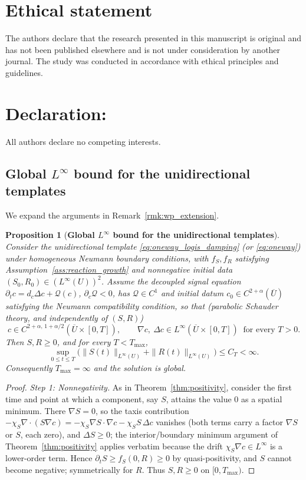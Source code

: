 \documentclass[pdflatex,sn-mathphys-ay]{sn-jnl}
\theoremstyle{thmstyleone}
\newtheorem{proposition}[theorem]{Proposition}
\theoremstyle{definition}
\theoremstyle{remark}
\begin{document}
\section*{Ethical statement}
The authors declare that the research presented in this manuscript is original and has not
been published elsewhere and is not under consideration by another journal. The study was conducted in
accordance with ethical principles and guidelines.

\section*{Declaration:}
All authors declare no competing interests.

\begin{appendices}
\section{Global \texorpdfstring{$L^\infty$}{L-infinity} bound for the unidirectional templates}\label{appsec:global_bound_unidirectional}
We expand the arguments in Remark~\ref{rmk:wp_extension}.

\begin{proposition}[\textbf{Global $L^\infty$ bound for the unidirectional templates}]
\label{prop:global_oneway}
Consider the unidirectional template \eqref{eq:oneway_logis_damping} (or
\eqref{eq:oneway}) under homogeneous Neumann boundary conditions, with $f_S,f_R$
satisfying Assumption~\ref{ass:reaction_growth} and nonnegative initial data
$(S_0,R_0)\in (L^\infty(U))^2$. Assume the decoupled signal equation
$\partial_t c=d_c\Delta c+\mathcal Q(c)$, $\partial_c\mathcal Q<0$, has
$\mathcal Q\in C^1$ and initial datum $c_0\in C^{2+\alpha}(\overline U)$ satisfying
the Neumann compatibility condition, so that (parabolic Schauder theory, and
independently of $(S,R)$)
\[
c\in C^{2+\alpha,\,1+\alpha/2}(\overline U\times[0,T]),
\qquad
\nabla c,\ \Delta c\in L^\infty(\overline U\times[0,T])\ \text{ for every }T>0 .
\]
Then $S,R\ge0$, and for every $T<T_{\max}$,
\[
\sup_{0\le t\le T}\bigl(\|S(t)\|_{L^\infty(U)}+\|R(t)\|_{L^\infty(U)}\bigr)\le C_T<\infty .
\]
Consequently $T_{\max}=\infty$ and the solution is global.
\end{proposition}

\begin{proof}
\emph{Step 1: Nonnegativity.} As in Theorem~\ref{thm:positivity}, consider the first
time and point at which a component, say $S$, attains the value $0$ as a spatial
minimum. There $\nabla S=0$, so the taxis contribution
$-\chi_S\nabla\!\cdot(S\nabla c)=-\chi_S\nabla S\!\cdot\!\nabla c-\chi_S S\,\Delta c$
vanishes (both terms carry a factor $\nabla S$ or $S$, each zero), and
$\Delta S\ge0$; the interior/boundary minimum argument of Theorem~\ref{thm:positivity}
applies verbatim because the drift $\chi_S\nabla c\in L^\infty$ is a lower-order
term. Hence $\partial_t S\ge f_S(0,R)\ge0$ by quasi-positivity, and $S$ cannot
become negative; symmetrically for $R$. Thus $S,R\ge0$ on $[0,T_{\max})$.


\end{proof}
\end{appendices}
\end{document}
